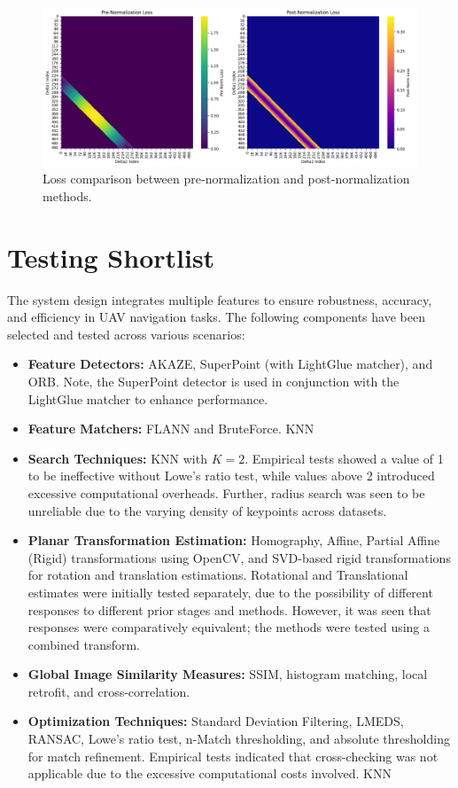 \begin{figure}[H]
    \centering
    \includegraphics[width=\textwidth]{Chapter 4/Figs4/lossprevspost.png}
    \caption{Loss comparison between pre-normalization and post-normalization methods.}
    \label{fig:lossprevpost}
\end{figure}






\section{Testing Shortlist}
\label{sec:testing_shortlist}

The system design integrates multiple features to ensure robustness, accuracy, and efficiency in UAV navigation tasks. The following components have been selected and tested across various scenarios:

\begin{itemize}
    \item \textbf{Feature Detectors:} AKAZE, SuperPoint (with LightGlue matcher), and ORB. Note, the SuperPoint detector is used in conjunction with the LightGlue matcher to enhance performance.
    \item \textbf{Feature Matchers:} FLANN and BruteForce. KNN 
    \item \textbf{Search Techniques:} KNN with \( K=2 \). Empirical tests showed a value of 1 to be ineffective without Lowe's ratio test, while values above 2 introduced excessive computational overheads. Further, radius search was seen to be unreliable due to the varying density of keypoints across datasets.
    \item \textbf{Planar Transformation Estimation:} Homography, Affine, Partial Affine (Rigid) transformations using OpenCV, and SVD-based rigid transformations for rotation and translation estimations. Rotational and Translational estimates were initially tested separately, due to the possibility of different responses to different prior stages and methods. However, it was seen that responses were comparatively equivalent; the methods were tested using a combined transform.
    \item \textbf{Global Image Similarity Measures:} SSIM, histogram matching, local retrofit, and cross-correlation.
    \item \textbf{Optimization Techniques:} Standard Deviation Filtering, LMEDS, RANSAC, Lowe's ratio test, n-Match thresholding, and absolute thresholding for match refinement. Empirical tests indicated that cross-checking was not applicable due to the excessive computational costs involved. KNN
\end{itemize}


